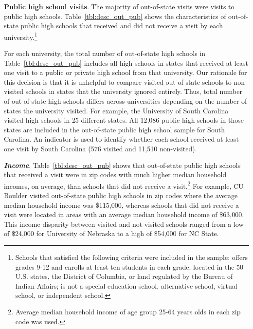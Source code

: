 \documentclass[twoside]{article}
\begin{document}



\textbf{Public high school visits}. The majority of out-of-state visits were visits to public high schools. Table~\ref{tbl:desc_out_pub} shows the characteristics of out-of-state public high schools that received and did not receive a visit by each university.\footnote{Schools that satisfied the following criteria were included in the sample: offers grades 9-12 and enrolls at least ten students in each grade; located in the 50 U.S. states, the District of Columbia, or land regulated by the Bureau of Indian Affairs; is not a special education school, alternative school, virtual school, or independent school.}

For each university, the total number of out-of-state high schools in Table~\ref{tbl:desc_out_pub} includes all high schools in states that received at least one visit to a public or private high school from that university.  Our rationale for this decision is that it is unhelpful to compare visited out-of-state schools to non-visited schools in states that the university ignored entirely. Thus, total number of out-of-state high schools differs across universities depending on the number of states the university visited.  For example, the University of South Carolina visited high schools in 25 different states. All 12,086 public high schools in those states are included in the out-of-state public high school sample for South Carolina. An indicator is used to identify whether each school received at least one visit by South Carolina (576 visited and 11,510 non-visited).


\textbf{\textit{Income}}. Table~\ref{tbl:desc_out_pub} shows that out-of-state public high schools that received a visit were in zip codes with much higher median household incomes, on average, than schools that did not receive a visit.\footnote{Average median household income of age group 25-64 years olds in each zip code was used.} For example, CU Boulder visited out-of-state public high schools in zip codes where the average median household income was \$115,000, whereas schools that did not receive a visit were located in areas with an average median household income of \$63,000. This income disparity between visited and not visited schools ranged from a low of \$24,000 for University of Nebraska to a high of \$54,000 for NC State. %
\end{document}
